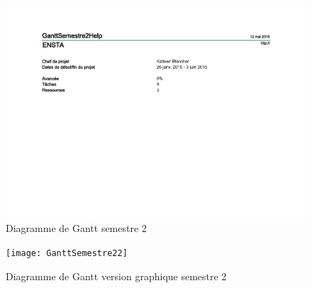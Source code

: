 \begin{figure}[H]
  \centering
  \includegraphics[scale=1]{GanttSemestre2}
  \caption{Diagramme de Gantt semestre 2}
  \label{fig:GanttSemestre2}
\end{figure}

\begin{figure}[H]
  \centering
  \texttt{[image: GanttSemestre22]}
  \caption{Diagramme de Gantt version graphique semestre 2}
  \label{fig:GanttSemestre2}
\end{figure}